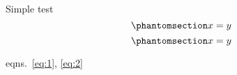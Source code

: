 Simple test
\begin{equation}\phantomsection\label{eq:1}{x=y}\label{eq:1}\end{equation}
\begin{equation}\phantomsection\label{eq:2}{x=y}\label{eq:2}\end{equation}

eqns.~\ref{eq:1}, \ref{eq:2}
